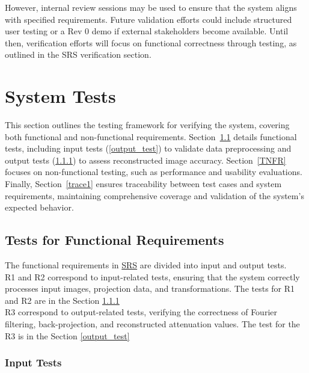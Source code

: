 \documentclass[12pt, titlepage]{article}
\begin{document}
However, internal review sessions may be used to ensure that the system
aligns with specified requirements. Future validation efforts could include
structured user testing or a Rev 0 demo if external stakeholders become
available. Until then, verification efforts will focus on functional correctness
through testing, as outlined in the SRS verification section.


\section{System Tests} \label{sec4} This section outlines the testing framework
for verifying the system, covering both functional and non-functional
requirements. Section~\ref{TFR} details functional tests, including input tests
(\ref{output_test}) to validate data preprocessing and output tests
(\ref{input_test}) to assess reconstructed image accuracy. Section~\ref{TNFR}
focuses on non-functional testing, such as performance and usability
evaluations. Finally, Section~\ref{trace1} ensures traceability between test cases and
system requirements, maintaining comprehensive coverage and validation of the
system’s expected behavior.

\subsection{Tests for Functional Requirements} \label{TFR}
The functional requirements in \href{https://github.com/marischan888/Computed-Tomography-Image-Reconstruction/blob/main/docs/SRS/SRS.pdf}{SRS} are divided into input and output
tests. \\
R1 and R2 correspond to input-related tests, ensuring that the system
correctly processes input images, projection data, and transformations. The
tests for R1 and R2 are in the Section \ref{input_test} \\
R3 correspond to output-related tests, verifying the correctness of
Fourier filtering, back-projection, and reconstructed attenuation values. The
test for the R3 is in the Section \ref{output_test} \\

\subsubsection{Input Tests} \label{input_test}
\end{document}
